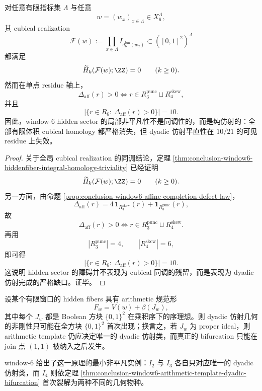 \begin{theorem}\label{thm:conclusion-window6-homology-affinity-separation}
对任意有限指标集 \(\Lambda\) 与任意
\[
w=(w_x)_{x\in\Lambda}\in X_6^\Lambda,
\]
其 cubical realization
\[
\mathcal F(w):=\prod_{x\in\Lambda} I_{d_6^{\mathrm{bin}}(w_x)}
\subset ([0,1]^2)^\Lambda
\]
都满足
\[
\widetilde H_k(\mathcal F(w);\ZZ)=0
\qquad (k\ge 0).
\]
然而在单点 residue 轴上，
\[
\Delta_{\mathrm{aff}}(r)>0
\iff
r\in R_{3}^{\mathrm{punc}}\sqcup R_{4}^{\mathrm{skew}},
\]
并且
\[
\bigl|\{r\in R_6:\ \Delta_{\mathrm{aff}}(r)>0\}\bigr|=10.
\]
因此，window-\(6\) hidden sector 的局部非平凡性不是同调性的，而是纯仿射的：全部有限体积 cubical homology 都严格消失，但 dyadic 仿射平直性在 \(10/21\) 的可见 residue 上失效。
\end{theorem}
\begin{proof}
关于全局 cubical realization 的同调结论，定理 \ref{thm:conclusion-window6-hiddenfiber-integral-homology-triviality} 已经证明
\[
\widetilde H_k(\mathcal F(w);\ZZ)=0
\qquad (k\ge 0).
\]
另一方面，由命题 \ref{prop:conclusion-window6-affine-completion-defect-law}，
\[
\Delta_{\mathrm{aff}}(r)=4\,\mathbf 1_{R_{4}^{\mathrm{skew}}}(r)+\mathbf 1_{R_{3}^{\mathrm{punc}}}(r),
\]
故
\[
\Delta_{\mathrm{aff}}(r)>0
\iff
r\in R_{3}^{\mathrm{punc}}\sqcup R_{4}^{\mathrm{skew}}.
\]
再用
\[
|R_{3}^{\mathrm{punc}}|=4,
\qquad
|R_{4}^{\mathrm{skew}}|=6,
\]
即可得
\[
\bigl|\{r\in R_6:\ \Delta_{\mathrm{aff}}(r)>0\}\bigr|=10.
\]
这说明 hidden sector 的障碍并不表现为 cubical 同调的残留，而是表现为 dyadic 仿射完成的严格缺口。证毕。
\end{proof}

\begin{conjecture}\label{conj:conclusion-window6-boolean-completion-bifurcation-principle}
设某个有限窗口的 hidden fibers 具有 arithmetic 规范形
\[
F_w=V(w)+\beta(J_w),
\]
其中每个 \(J_w\) 都是 Boolean 方块 \(\{0,1\}^2\) 在乘积序下的序理想。则 dyadic 仿射几何的非刚性只可能在全方块 \(\{0,1\}^2\) 首次出现；换言之，若 \(J_w\) 为 proper ideal，则 arithmetic template 仍应决定唯一的 dyadic 仿射类，而真正的 bifurcation 只能在 join 点 \((1,1)\) 被纳入之后发生。

window-\(6\) 给出了这一原理的最小非平凡实例：\(I_2\) 与 \(I_3\) 各自只对应唯一的 dyadic 仿射类，而 \(I_4\) 则依定理 \ref{thm:conclusion-window6-arithmetic-template-dyadic-bifurcation} 首次裂解为两种不同的几何物种。
\end{conjecture}
